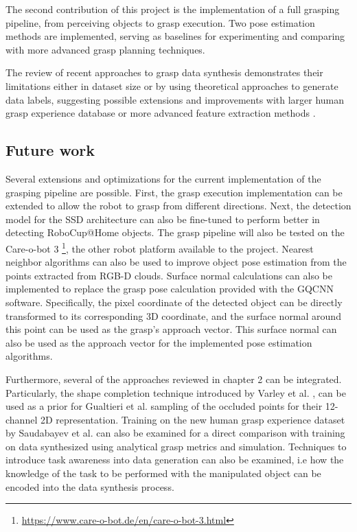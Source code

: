 \documentclass[runningheads]{../llncs}
\begin{document}
The second contribution of this project is the implementation of a full grasping pipeline, from perceiving objects to
grasp execution. Two pose estimation methods are implemented, serving as baselines for experimenting and comparing with
more advanced grasp planning techniques.

The review of recent approaches to grasp data synthesis demonstrates their limitations either in dataset size or by
using theoretical approaches to generate data labels, suggesting possible extensions and improvements with larger human
grasp experience database \cite{Saudabayev2018} or more advanced feature extraction methods \cite{Varley2017}.

\subsection{Future work}

Several extensions and optimizations for the current implementation of the grasping pipeline are possible. First, the
grasp execution implementation can be extended to allow the robot to grasp from different directions. Next, the
detection model for the SSD architecture can also be fine-tuned to perform better in detecting RoboCup@Home objects.
The grasp pipeline will also be tested on the Care-o-bot 3
\footnote{\url{https://www.care-o-bot.de/en/care-o-bot-3.html}}, the other robot platform available to the project.
Nearest neighbor algorithms can also be used to improve object pose estimation from the points extracted from RGB-D
clouds. Surface normal calculations can also be implemented to replace the grasp pose calculation provided with the
GQCNN software. Specifically, the pixel coordinate of the detected object can be directly transformed to its
corresponding 3D coordinate, and the surface normal around this point can be used as the grasp's approach vector. This
surface normal can also be used as the approach vector for the implemented pose estimation algorithms.

Furthermore, several of the approaches reviewed in chapter 2 can be integrated. Particularly, the shape completion
technique introduced by Varley et al. \cite{Varley2017}, can be used as a prior for Gualtieri et al.
\cite{Gualtieri2016} sampling of the occluded points for their 12-channel 2D representation. Training on the new human
grasp experience dataset by Saudabayev et al. \cite{Saudabayev2018} can also be examined for a direct comparison with
training on data synthesized using analytical grasp metrics and simulation. Techniques to introduce task awareness into
data generation can also be examined, i.e how the knowledge of the task to be performed with the manipulated object can
be encoded into the data synthesis process.

%

{
    \scriptsize
    
}
%
\end{document}
